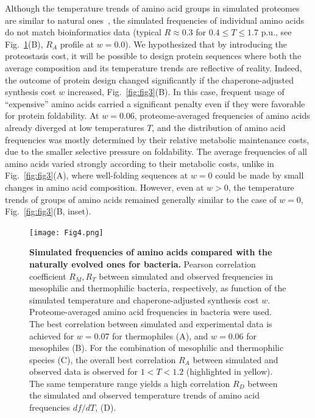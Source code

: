 \documentclass[10pt,letterpaper]{article}
\begin{document}
Although the temperature trends of amino acid groups in simulated proteomes are similar to natural ones~\cite{Berezovsky2007Positive,Venev2015Massively}, the simulated frequencies of individual amino acids do not match bioinformatics data (typical $R\approx0.3$ for $0.4\leq T\leq 1.7$ p.u., see Fig.~\ref{fig:fig4}(B), $R_A$ profile at $w=0.0$). We hypothesized that by introducing the proteostasis cost, it will be possible to design protein sequences where both the average composition and its temperature trends are reflective of reality. Indeed, the outcome of protein design changed significantly if the chaperone-adjusted synthesis cost $w$ increased, Fig.~\ref{fig:fig3}(B). In this case, frequent usage of ``expensive'' amino acids carried a significant penalty even if they were favorable for protein foldability. At $w=0.06$, proteome-averaged frequencies of amino acids already diverged at low temperatures $T$, and the distribution of amino acid frequencies was mostly determined by their relative metabolic maintenance costs, due to the smaller selective pressure on foldability. The average frequencies of all amino acids varied strongly according to their metabolic costs, unlike in Fig.~\ref{fig:fig3}(A), where well-folding sequences at $w=0$ could be made by small changes in amino acid composition. However, even at $w>0$, the temperature trends of groups of amino acids remained generally similar to the case of $w=0$, Fig.~\ref{fig:fig3}(B, inset).


\begin{figure}[h!]
\texttt{[image: Fig4.png]}
\caption{
{\bf Simulated frequencies of amino acids compared with the naturally evolved ones for bacteria.} 
Pearson correlation coefficient $R_M, R_T$ between simulated and observed frequencies in mesophilic and thermophilic bacteria, respectively, as function of the simulated temperature and chaperone-adjusted synthesis cost $w$. Proteome-averaged amino acid frequencies in bacteria were used. The best correlation between simulated and experimental data is achieved for $w=0.07$ for thermophiles (A), and $w=0.06$ for mesophiles (B). For the combination of mesophilic and thermophilic species (C), the overall best correlation $R_A$ between simulated and observed data is observed for $1<T<1.2$ (highlighted in yellow). The same temperature range yields a high correlation $R_D$ between the simulated and observed temperature trends of amino acid frequencies $df/dT$, (D).
}
\label{fig:fig4}
\end{figure}
\end{document}
